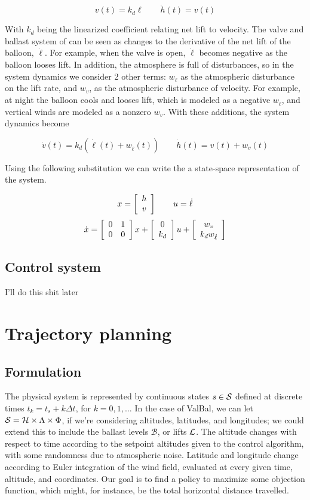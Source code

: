 \documentclass[11pt]{scrartcl} %
\begin{document}
\[ v(t) = k_d \ell \qquad \dot h(t) = v(t)\]

With $k_d$ being the linearized coefficient relating net lift to velocity. The valve and ballast system of can be seen as changes to the derivative of the net lift of the balloon, $\dot \ell$. For example, when the valve is open, $\dot \ell$ becomes negative as the balloon looses lift. In addition, the atmosphere is full of disturbances, so in the system dynamics we consider 2 other terms: $w_{\dot \ell}$ as the atmospheric disturbance on the lift rate, and $w_v$, as the atmospheric disturbance of velocity. For example, at night the balloon cools and looses lift, which is modeled as a negative $w_{\dot \ell}$, and vertical winds are modeled as a nonzero $w_v$. With these additions, the system dynamics become

\[ \dot v(t) = k_d(\dot \ell(t) + w_{\dot \ell}(t)) \qquad \dot h(t) = v(t) + w_v(t) \]

Using the following substitution we can write the a state-space representation of the system. 

\[x = \mx{c}{h \\ v} \qquad u = \dot \ell\]
\[\dot x = \mx{cc}{0 & 1 \\ 0 & 0}x + \mx{cc}{0 \\ k_d} u + \mx{c}{w_v \\ k_d w_{\dot \ell}}\]

\subsection{Control system}

I'll do this shit later

\section{Trajectory planning}

\subsection{Formulation}
The physical system is represented by continuous states $s\in\States$ defined at discrete times $t_k=t_s + k \Delta t$, for $k=0,1,\dots$ In the case of ValBal, we can let $\States=\Altitudes\times\Lambda\times\Phi$, if we're considering altitudes, latitudes, and longitudes; we could extend this to include the ballast levels $\mathcal{B}$, or lifts $\Lifts$.
The altitude changes with respect to time according to the setpoint altitudes given to the control algorithm, with some randomness due to atmospheric noise. Latitude and longitude change according to Euler integration of the wind field, evaluated at every given time, altitude, and coordinates. Our goal is to find a policy to maximize some objection function, which might, for instance, be the total horizontal distance travelled.
\end{document}
